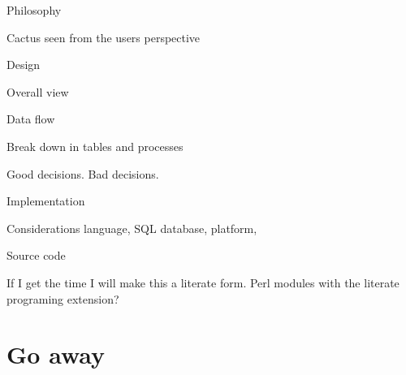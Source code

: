    Philosophy




   Cactus seen from the users perspective


   Design

   Overall view

   Data flow

   Break down in tables and processes

   Good decisions. Bad decisions.


   Implementation

   Considerations language, SQL database, platform,


   Source code

   If I get the time I will make this a literate form. Perl modules with
   the literate programing extension?







\chapter{Go away}









